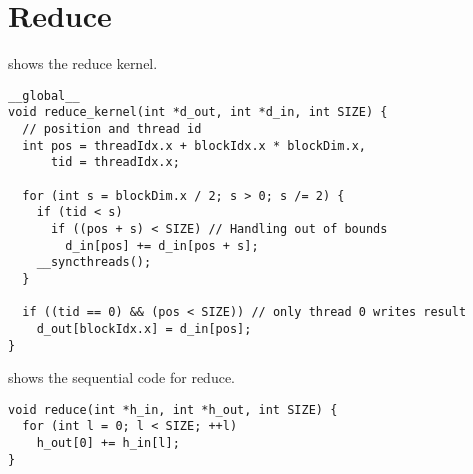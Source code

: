 \section{Reduce}
\label{sec:reduce}

 shows the reduce kernel.

\begin{lstlisting}[caption={Reduce kernel}, label={lst:reduce par}]
__global__
void reduce_kernel(int *d_out, int *d_in, int SIZE) {
  // position and thread id
  int pos = threadIdx.x + blockIdx.x * blockDim.x,
      tid = threadIdx.x;

  for (int s = blockDim.x / 2; s > 0; s /= 2) {
    if (tid < s)
      if ((pos + s) < SIZE) // Handling out of bounds
        d_in[pos] += d_in[pos + s];
    __syncthreads();
  }

  if ((tid == 0) && (pos < SIZE)) // only thread 0 writes result
    d_out[blockIdx.x] = d_in[pos];
}
\end{lstlisting}

%
%
%

 shows the sequential code for reduce.

\begin{lstlisting}[caption={Sequential reduce}, label={lst:reduce seq}]
void reduce(int *h_in, int *h_out, int SIZE) {
  for (int l = 0; l < SIZE; ++l) 
    h_out[0] += h_in[l];
}
\end{lstlisting}
